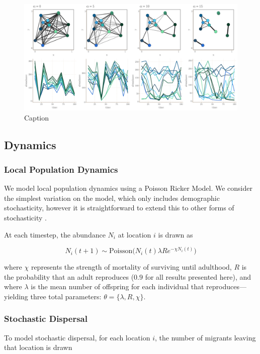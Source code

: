 \documentclass[]{article}
\begin{document}
\begin{figure}[H]
    \centering
    \includegraphics[width=15cm]{figs/metapops.png}
    \caption{Caption}
    \label{fig:mp}
\end{figure}

\subsection{Dynamics}

\subsubsection{Local Population Dynamics}

We model local population dynamics using a Poisson Ricker Model. We consider the simplest variation on the model, which only includes demographic stochasticity, however it is straightforward to extend this to other forms of stochasticity \cite{melbourne_extinction_2008}.

At each timestep, the abundance $N_i$ at location $i$ is drawn as

$$N_i(t+1) \sim \text{Poisson}\bigg(N_i(t) \lambda R e^{- \chi N_i(t)}\bigg)$$

where $\chi$ represents the strength of mortality of surviving until adulthood, $R$ is the probability that an adult reproduces ($0.9$ for all results presented here), and where $\lambda$ is the mean number of offspring for each individual that reproduces---yielding three total parameters: $\theta = \{\lambda, R, \chi \}$. 




\subsubsection{Stochastic Dispersal}


To model stochastic dispersal, for each location $i$, the number of migrants leaving that location is drawn 
\end{document}
